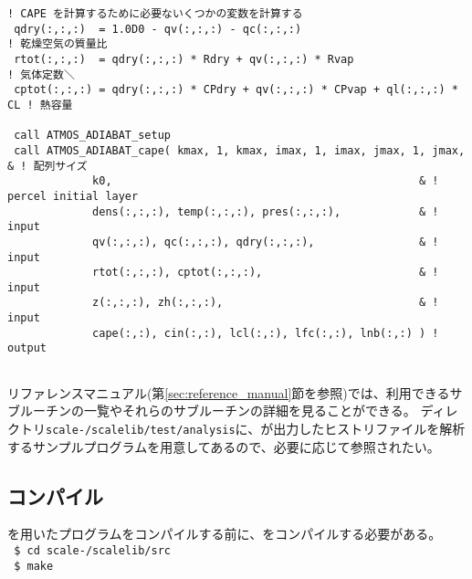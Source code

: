 {  \verb|! CAPE を計算するために必要ないくつかの変数を計算する|\\
  \verb| qdry(:,:,:)  = 1.0D0 - qv(:,:,:) - qc(:,:,:)                            ! 乾燥空気の質量比|\\
  \verb| rtot(:,:,:)  = qdry(:,:,:) * Rdry + qv(:,:,:) * Rvap                    ! 気体定数＼|\\
  \verb| cptot(:,:,:) = qdry(:,:,:) * CPdry + qv(:,:,:) * CPvap + ql(:,:,:) * CL ! 熱容量|\\
  \verb|                         |\\
  \verb| call ATMOS_ADIABAT_setup|\\
  \verb| call ATMOS_ADIABAT_cape( kmax, 1, kmax, imax, 1, imax, jmax, 1, jmax,      & ! 配列サイズ|\\
  \hspace{12em}\verb|             k0,                                               & ! percel initial layer|\\
  \hspace{12em}\verb|             dens(:,:,:), temp(:,:,:), pres(:,:,:),            & ! input|\\
  \hspace{12em}\verb|             qv(:,:,:), qc(:,:,:), qdry(:,:,:),                & ! input|\\
  \hspace{12em}\verb|             rtot(:,:,:), cptot(:,:,:),                        & ! input|\\
  \hspace{12em}\verb|             z(:,:,:), zh(:,:,:),                              & ! input|\\
  \hspace{12em}\verb|             cape(:,:), cin(:,:), lcl(:,:), lfc(:,:), lnb(:,:) ) ! output|\\
  \verb| |\\
}

リファレンスマニュアル(第\ref{sec:reference_manual}節を参照)では、利用できるサブルーチンの一覧やそれらのサブルーチンの詳細を見ることができる。
ディレクトリ\texttt{scale-\version/scalelib/test/analysis}に、\scalerm が出力したヒストリファイルを解析するサンプルプログラムを用意してあるので、必要に応じて参照されたい。


\subsection{コンパイル}

\scalelib を用いたプログラムをコンパイルする前に、\scalelib をコンパイルする必要がある。\\
\texttt{ \$ cd scale-\version/scalelib/src}\\
\texttt{ \$ make}

